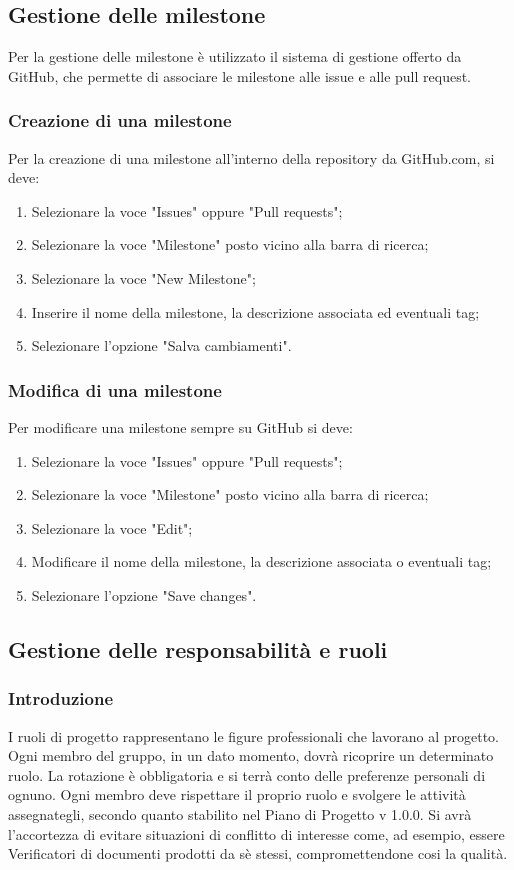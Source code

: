 \subsection{Gestione delle milestone}
Per la gestione delle {milestone} è utilizzato il sistema di gestione offerto da GitHub, che permette di associare le milestone alle issue e alle pull request.
\subsubsection{Creazione di una milestone}
Per la creazione di una milestone all'interno della repository da GitHub.com, si deve:
\begin{enumerate}
\item Selezionare la voce "Issues" oppure "Pull requests";
\item Selezionare la voce "Milestone" posto vicino alla barra di ricerca;
\item Selezionare la voce "New Milestone";
\item Inserire il nome della milestone, la descrizione associata ed eventuali tag;
\item Selezionare l'opzione "Salva cambiamenti".
\end{enumerate}
\subsubsection{Modifica di una milestone}
Per modificare una milestone sempre su GitHub si deve:
\begin{enumerate}
\item Selezionare la voce "Issues" oppure "Pull requests";
\item Selezionare la voce "Milestone" posto vicino alla barra di ricerca;
\item Selezionare la voce "Edit";
\item Modificare il nome della milestone, la descrizione associata o eventuali tag;
\item Selezionare l'opzione "Save changes".
\end{enumerate}

\subsection{Gestione delle responsabilità e ruoli}

\subsubsection{Introduzione}
I ruoli di progetto rappresentano le figure professionali che lavorano al progetto. Ogni membro del gruppo, in un dato momento, dovrà ricoprire un determinato ruolo.  
\newline
La rotazione è obbligatoria e si terrà conto delle preferenze personali di ognuno. Ogni membro deve rispettare il proprio ruolo e svolgere le attività assegnategli, secondo quanto stabilito nel Piano di Progetto v 1.0.0. Si avrà l'accortezza di evitare situazioni di conflitto di interesse come, ad esempio, essere Verificatori di documenti prodotti da sè stessi, compromettendone cosi la qualità.

